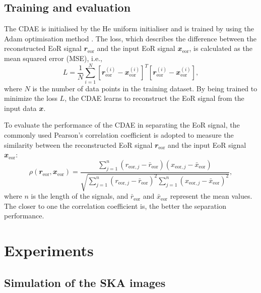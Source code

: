 \documentclass[fleqn,usenatbib]{mnras}
\newcommand{\R}[1]{\mathrm{#1}}
\newcommand{\B}[1]{\mathbfit{#1}}
\begin{document}
\subsection{Training and evaluation}
\label{sec:train-eval}

The CDAE is initialised by the He uniform initialiser \citep{he2015}
and is trained by using the Adam optimisation method \citep{kingma2015}.
The loss, which describes the difference between the reconstructed EoR
signal $\B{r}_{\R{eor}}$ and the input EoR signal $\B{x}_{\R{eor}}$,
is calculated as the mean squared error (MSE), i.e.,
\begin{equation}
  \label{eq:loss}
  L = \frac{1}{N} \sum_{i=1}^{N}
    \left[ \B{r}_{\R{eor}}^{(i)} - \B{x}_{\R{eor}}^{(i)} \right]^T
    \left[ \B{r}_{\R{eor}}^{(i)} - \B{x}_{\R{eor}}^{(i)} \right],
\end{equation}
where $N$ is the number of data points in the training dataset.
By being trained to minimize the loss $L$, the CDAE learns to
reconstruct the EoR signal from the input data $\B{x}$.

To evaluate the performance of the CDAE in separating the EoR signal,
the commonly used Pearson's correlation coefficient
\citep[e.g.,][]{harker2009,chapman2013}
is adopted to measure the similarity between the reconstructed EoR
signal $\B{r}_{\R{eor}}$ and the input EoR signal $\B{x}_{\R{eor}}$:
\begin{equation}
  \label{eq:corrcoef}
  \rho(\B{r}_{\R{eor}}, \B{x}_{\R{eor}})
      = \frac{\sum_{j=1}^{n}(r_{\R{eor},j} - \bar{r}_{\R{eor}})
      (x_{\R{eor},j} - \bar{x}_{\R{eor}})}{
        \sqrt{\sum_{j=1}^{n}(r_{\R{eor},j} - \bar{r}_{\R{eor}})^2
          \sum_{j=1}^{n}(x_{\R{eor},j} - \bar{x}_{\R{eor}})^2}
    },
\end{equation}
where $n$ is the length of the signals,
and $\bar{r}_{\R{eor}}$ and $\bar{x}_{\R{eor}}$ represent the mean values.
The closer to one the correlation coefficient is, the better the separation
performance.


\section{Experiments}
\label{sec:experiments}

\subsection{Simulation of the SKA images}
\label{sec:simulation}
\end{document}
